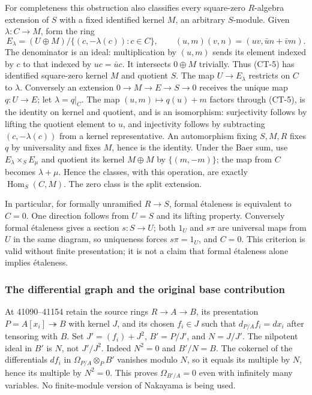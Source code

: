 For completeness this obstruction also classifies every square-zero \(R\)-algebra extension of \(S\) with a fixed identified kernel \(M\), an arbitrary \(S\)-module. Given \(\lambda:C\to M\), form the ring \[
E_\lambda=(U\oplus M)/
\{(c,-\lambda(c)):c\in C\},\qquad
(u,m)(v,n)=(uv,\bar u n+\bar v m).
\tag{CT-5}
\] The denominator is an ideal: multiplication by \((u,m)\) sends its element indexed by \(c\) to that indexed by \(uc=\bar u c\). It intersects \(0\oplus M\) trivially. Thus (CT-5) has identified square-zero kernel \(M\) and quotient \(S\). The map \(U\to E_\lambda\) restricts on \(C\) to \(\lambda\). Conversely an extension \(0\to M\to E\to S\to0\) receives the unique map \(q:U\to E\); let \(\lambda=q|_C\). The map \((u,m)\mapsto q(u)+m\) factors through (CT-5), is the identity on kernel and quotient, and is an isomorphism: surjectivity follows by lifting the quotient element to \(u\), and injectivity follows by subtracting \((c,-\lambda(c))\) from a kernel representative. An automorphism fixing \(S,M,R\) fixes \(q\) by universality and fixes \(M\), hence is the identity. Under the Baer sum, use \(E_\lambda\times_SE_\mu\) and quotient its kernel \(M\oplus M\) by \(\{(m,-m)\}\); the map from \(C\) becomes \(\lambda+\mu\). Hence the classes, with this operation, are exactly \(\operatorname{Hom}_S(C,M)\). The zero class is the split extension.

In particular, for formally unramified \(R\to S\), formal étaleness is equivalent to \(C=0\). One direction follows from \(U=S\) and its lifting property. Conversely formal étaleness gives a section \(s:S\to U\); both \(1_U\) and \(s\pi\) are universal maps from \(U\) in the same diagram, so uniqueness forces \(s\pi=1_U\), and \(C=0\). This criterion is valid without finite presentation; it is not a claim that formal étaleness alone implies étaleness.

\subsubsection{The differential graph and the original base contribution}\label{algebra-proof-055-the-differential-graph-and-the-original-base-contribution}

At 41090--41154 retain the source rings \(R\to A\to B\), its presentation \(P=A[x_i]\twoheadrightarrow B\) with kernel \(J\), and its chosen \(f_i\in J\) such that \(d_{P/A}f_i=dx_i\) after tensoring with \(B\). Set \(J'=(f_i)+J^2\), \(B'=P/J'\), and \(N=J/J'\). The nilpotent ideal in \(B'\) is \(N\), not \(J'/J^2\). Indeed \(N^2=0\) and \(B'/N=B\). The cokernel of the differentials \(df_i\) in \(\Omega_{P/A}\otimes_PB'\) vanishes modulo \(N\), so it equals its multiple by \(N\), hence its multiple by \(N^2=0\). This proves \(\Omega_{B'/A}=0\) even with infinitely many variables. No finite-module version of Nakayama is being used.

